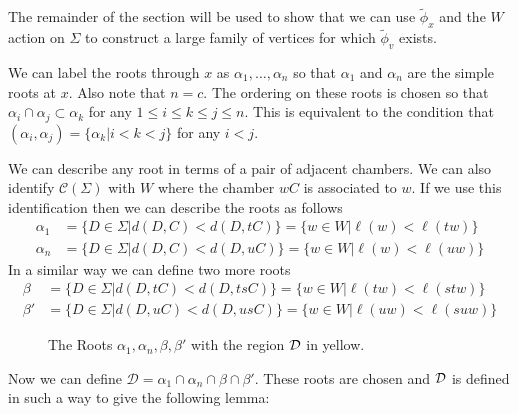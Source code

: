 \documentclass[class=book, crop=false,12 pt]{standalone}
\begin{document}
The remainder of the section will be used to show that we can use $\tilde{\phi}_x$ and the $W$ action on $\Sigma$ to construct a large family of vertices for which $\tilde{\phi}_v$ exists.


We can label the roots through $x$ as $\alpha_1,\dots,\alpha_n$ so that $\alpha_1$ and $\alpha_n$ are the simple roots at $x.$ Also note that $n=c.$ The ordering on these roots is chosen so that $\alpha_i\cap \alpha_j\subset \alpha_k$ for any $1\le i \le k \le j\le n.$ This is equivalent to the condition that $(\alpha_i,\alpha_j)=\{\alpha_k|i<k<j\}$ for any $i<j.$

We can describe any root in terms of a pair of adjacent chambers. We can also identify $\mathcal{C}(\Sigma)$ with $W$ where the chamber $wC$ is associated to $w.$ If we use this identification then we can describe the roots as follows
\begin{align*}
	\alpha_1&=\{D\in \Sigma|d(D,C)<d(D,tC)\}=\{w\in W|\ell(w)<\ell(tw)\}\\
	\alpha_n&=\{D\in \Sigma|d(D,C)<d(D,uC)\}=\{w\in W|\ell(w)<\ell(uw)\}
\end{align*}
In a similar way we can define two more roots
\begin{align*}
	\beta&=\{D\in \Sigma|d(D,tC)<d(D,tsC)\}=\{w\in W|\ell(tw)<\ell(stw)\}\\
	\beta'&=\{D\in \Sigma|d(D,uC)<d(D,usC)\}=\{w\in W|\ell(uw)<\ell(suw)\}
\end{align*}
\begin{figure}[h]
	\label{fig:defineD}
	\begin{center}
	\caption{The Roots $\alpha_1,\alpha_n,\beta,\beta'$ with the region $\mathcal{D}$ in yellow.}
\end{center}
\end{figure}

Now we can define $\mathcal{D}=\alpha_1\cap \alpha_n \cap \beta\cap \beta'.$ These roots are chosen and $\mathcal{D}$ is defined in such a way to give the following lemma:
\end{document}
